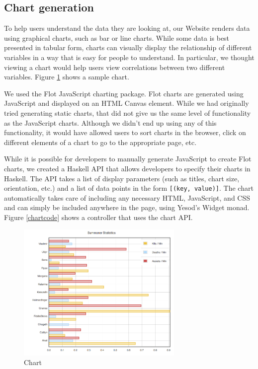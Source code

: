\documentclass[letterpaper,twocolumn,9pt]{article}
\newcommand{\code}[1]{\texttt{#1}}
\begin{document}
\subsection{Chart generation}

To help users understand the data they are looking at, our Website renders data using graphical charts, such as bar or line charts. While some data is best presented in tabular form, charts can visually display the relationship of different variables in a way that is easy for people to understand. In particular, we thought viewing a chart would help users view correlations between two different variables. Figure \ref{chart} shows a sample chart.

We used the Flot\cite{flot} JavaScript charting package. Flot charts are generated using JavaScript and displayed on an HTML Canvas element. While we had originally tried generating static charts, that did not give us the same level of functionality as the JavaScript charts. Although we didn't end up using any of this functionality, it would have allowed users to sort charts in the browser, click on different elements of a chart to go to the appropriate page, etc.

While it is possible for developers to manually generate JavaScript to create Flot charts, we created a Haskell API that allows developers to specify their charts in Haskell. The API takes a list of display parameters (such as titles, chart size, orientation, etc.) and a list of data points in the form \code{[(key, value)]}. The chart automatically takes care of including any necessary HTML, JavaScript, and CSS and can simply be included anywhere in the page, using Yesod's Widget monad. Figure \ref{chartcode} shows a controller that uses the chart API. 

\begin{figure}[h]
    \includegraphics[width=80mm]{imgs/chart.png}
    \caption{Chart}
    \label{chart}
\end{figure}
\end{document}
